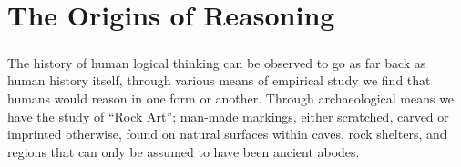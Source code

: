 \chapter{The Origins of Reasoning}\label{chapter:theoriginsofreasoning}

\paragraph{}The history of human logical thinking can be observed to go as far back as human history itself, through various means of empirical study we find that humans would reason in one form or another. Through archaeological means we have the study of  “Rock Art”; man-made markings, either scratched, carved or imprinted otherwise, found on natural surfaces within caves, rock shelters, and regions that can only be assumed to have been ancient abodes.